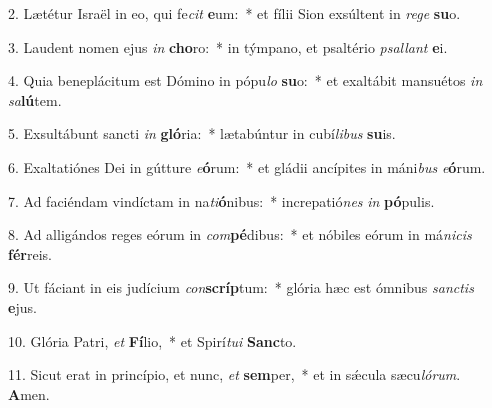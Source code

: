 2. Lætétur Israël in eo, qui fe\textit{cit} \textbf{e}um:~*  et fílii Sion exsúltent in \textit{re}\textit{ge} \textbf{su}o.\

3. Laudent nomen ejus \textit{in} \textbf{cho}ro:~*  in týmpano, et psaltério \textit{psal}\textit{lant} \textbf{e}i.\

4. Quia beneplácitum est Dómino in pópu\textit{lo} \textbf{su}o:~*  et exaltábit mansuétos \textit{in} \textit{sa}\textbf{lú}tem.\

5. Exsultábunt sancti \textit{in} \textbf{gló}ria:~*  lætabúntur in cubí\textit{li}\textit{bus} \textbf{su}is.\

6. Exaltatiónes Dei in gútture \textit{e}\textbf{ó}rum:~*  et gládii ancípites in máni\textit{bus} \textit{e}\textbf{ó}rum.\

7. Ad faciéndam vindíctam in na\textit{ti}\textbf{ó}nibus:~*  increpatió\textit{nes} \textit{in} \textbf{pó}pulis.\

8. Ad alligándos reges eórum in \textit{com}\textbf{pé}dibus:~*  et nóbiles eórum in má\textit{ni}\textit{cis} \textbf{fér}reis.\

9. Ut fáciant in eis judícium \textit{con}\textbf{scríp}tum:~*  glória hæc est ómnibus \textit{sanc}\textit{tis} \textbf{e}jus.\

10. Glória Patri, \textit{et} \textbf{Fí}lio,~*  et Spirí\textit{tu}\textit{i} \textbf{Sanc}to.\

11. Sicut erat in princípio, et nunc, \textit{et} \textbf{sem}per,~*  et in sǽcula sæcu\textit{ló}\textit{rum}. \textbf{A}men.\

